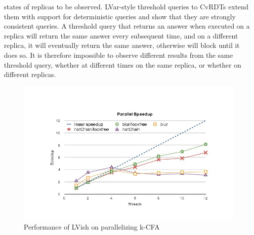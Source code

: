 \documentclass[twocolumn]{article}
\begin{document}
states of replicas to be observed. LVar-style threshold queries to CvRDTs extend them with support for deterministic queries and show that they are strongly consistent queries. A threshold query that returns an answer when executed on a replica will return the same answer every subsequent time, and on a different replica, it will eventually return the same answer, otherwise will block until it does so. It is therefore impossible to observe different results from the same threshold query, whether at
different times on the same replica, or whether on different replicas.

\begin{figure}
\centerline{
\includegraphics[width=1.3\columnwidth]{Figures/speedup.jpg}
}
\caption{Performance of LVish on parallelizing k-CFA\cite{lkuper2}}
\label{Figure2}
\end{figure}
\end{document}

